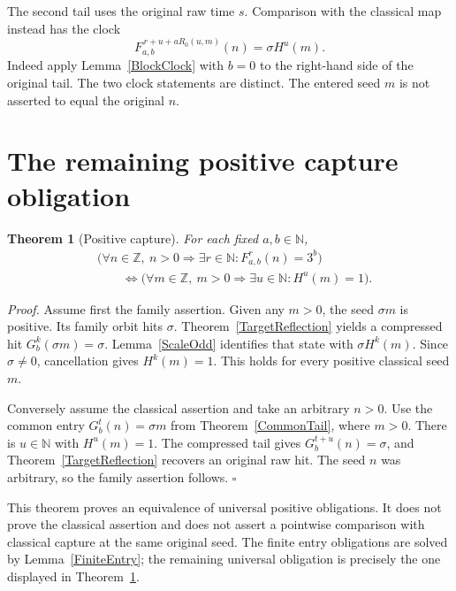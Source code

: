 \documentclass[11pt,letterpaper]{article}
\newcommand{\N}{\mathbb{N}}
\newcommand{\Z}{\mathbb{Z}}
\newtheorem{theorem}{Theorem}
\newenvironment{proof}{\noindent\textit{Proof.}}{\hfill\(\square\)}
\begin{document}
The second tail uses the original raw time \(s\).
Comparison with the classical map instead has the clock
\[
F_{a,b}^{\,r+u+aR_0(u,m)}(n)=\sigma H^u(m).
\]
Indeed apply Lemma~\ref{BlockClock} with \(b=0\) to the right-hand side
of the original tail. The two clock statements are distinct.
The entered seed \(m\) is not asserted to equal the original \(n\).

\section{The remaining positive capture obligation}

\begin{theorem}[Positive capture]\label{CaptureEquivalence}
For each fixed \(a,b\in\N\),
\[
\begin{aligned}
&\bigl(\forall n\in\Z,\ n>0\Longrightarrow
          \exists r\in\N:F_{a,b}^r(n)=3^b\bigr)\\
&\qquad\Longleftrightarrow
\bigl(\forall m\in\Z,\ m>0\Longrightarrow
          \exists u\in\N:H^u(m)=1\bigr).
\end{aligned}
\]
\end{theorem}

\begin{proof}
Assume first the family assertion. Given any \(m>0\), the seed
\(\sigma m\) is positive. Its family orbit hits \(\sigma\).
Theorem~\ref{TargetReflection} yields a compressed hit
\(G_b^k(\sigma m)=\sigma\). Lemma~\ref{ScaleOdd} identifies that state
with \(\sigma H^k(m)\). Since \(\sigma\ne0\), cancellation gives
\(H^k(m)=1\). This holds for every positive classical seed \(m\).

Conversely assume the classical assertion and take an arbitrary \(n>0\).
Use the common entry \(G_b^t(n)=\sigma m\) from
Theorem~\ref{CommonTail}, where \(m>0\).
There is \(u\in\N\) with \(H^u(m)=1\).
The compressed tail gives \(G_b^{t+u}(n)=\sigma\), and
Theorem~\ref{TargetReflection} recovers an original raw hit.
The seed \(n\) was arbitrary, so the family assertion follows.
\end{proof}

This theorem proves an equivalence of universal positive obligations.
It does not prove the classical assertion and does not assert a pointwise
comparison with classical capture at the same original seed.
The finite entry obligations are solved by Lemma~\ref{FiniteEntry};
the remaining universal obligation is precisely the one displayed
in Theorem~\ref{CaptureEquivalence}.
\end{document}

